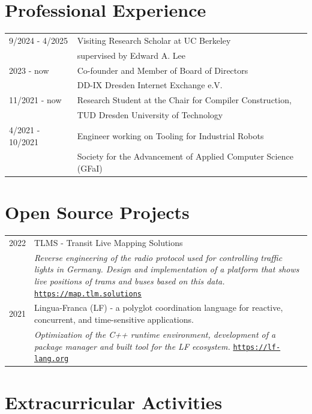 \documentclass[11pt, a4paper, oneside]{article}
\begin{document}
\section*{Professional Experience}

\begin{tabular}{R{3cm} L{12cm}}
  9/2024 - 4/2025   & Visiting Research Scholar at UC Berkeley \\
                    & supervised by Edward A. Lee \\
	2023 	- now				& Co-founder and Member of Board of Directors \\ & DD-IX Dresden Internet Exchange e.V. \\
	11/2021 	- now			& Research Student at the Chair for Compiler Construction, \\ 
										& TUD Dresden University of Technology \\ 
	4/2021 - 10/2021    & Engineer working on Tooling for Industrial Robots \\ 
										& Society for the Advancement of Applied Computer Science (GFaI)
\end{tabular}

\section*{Open Source Projects}

\begin{tabular}{R{3cm} L{13cm}}
	2022 							    & TLMS - Transit Live Mapping Solutions \\
	  										&	\emph{Reverse engineering of the radio protocol used for controlling traffic lights in Germany. Design and implementation of a platform that shows live positions of trams and buses based on this data.} \href{https://map.tlm.solutions}{\texttt{https://map.tlm.solutions}}  \\  
		2021 							& Lingua-Franca (LF) - a polyglot coordination language for reactive, concurrent, and time-sensitive applications.  \\ 
											& \emph{Optimization of the C++ runtime environment, development  of  a package manager and built tool for the LF ecosystem.} \href{https://lf-lang.org}{\texttt{https://lf-lang.org}} \\
\end{tabular}

\section*{Extracurricular Activities}
\end{document}
